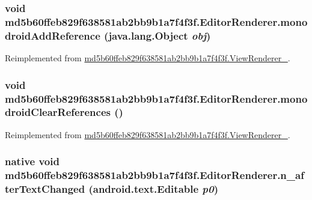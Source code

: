 \hypertarget{classmd5b60ffeb829f638581ab2bb9b1a7f4f3f_1_1_editor_renderer_d947b0fcb8dfc7fa6df3ad187936d3be}{
\subsubsection[{monodroidAddReference}]{\setlength{\rightskip}{0pt plus 5cm}void md5b60ffeb829f638581ab2bb9b1a7f4f3f.EditorRenderer.monodroidAddReference (java.lang.Object {\em obj})}}
\label{classmd5b60ffeb829f638581ab2bb9b1a7f4f3f_1_1_editor_renderer_d947b0fcb8dfc7fa6df3ad187936d3be}




Reimplemented from \hyperlink{classmd5b60ffeb829f638581ab2bb9b1a7f4f3f_1_1_view_renderer__2_64ca8244a89f60a47c173d9c0b15d610}{md5b60ffeb829f638581ab2bb9b1a7f4f3f.ViewRenderer\_}.\hypertarget{classmd5b60ffeb829f638581ab2bb9b1a7f4f3f_1_1_editor_renderer_b75e496c1b4ff6e3f542989834b44b8d}{
\subsubsection[{monodroidClearReferences}]{\setlength{\rightskip}{0pt plus 5cm}void md5b60ffeb829f638581ab2bb9b1a7f4f3f.EditorRenderer.monodroidClearReferences ()}}
\label{classmd5b60ffeb829f638581ab2bb9b1a7f4f3f_1_1_editor_renderer_b75e496c1b4ff6e3f542989834b44b8d}




Reimplemented from \hyperlink{classmd5b60ffeb829f638581ab2bb9b1a7f4f3f_1_1_view_renderer__2_dae20979ac761a65aa60c9b427509c37}{md5b60ffeb829f638581ab2bb9b1a7f4f3f.ViewRenderer\_}.\hypertarget{classmd5b60ffeb829f638581ab2bb9b1a7f4f3f_1_1_editor_renderer_6fa050a7e8b89d01fc6c51acafca5194}{
\subsubsection[{n\_\-afterTextChanged}]{\setlength{\rightskip}{0pt plus 5cm}native void md5b60ffeb829f638581ab2bb9b1a7f4f3f.EditorRenderer.n\_\-afterTextChanged (android.text.Editable {\em p0})}}
\label{classmd5b60ffeb829f638581ab2bb9b1a7f4f3f_1_1_editor_renderer_6fa050a7e8b89d01fc6c51acafca5194}


